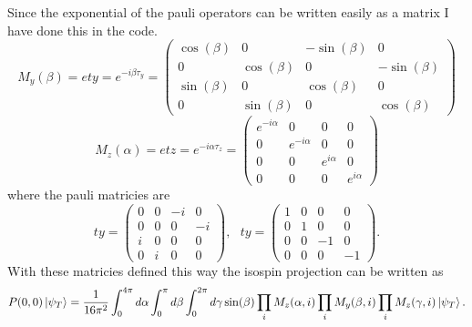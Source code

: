 Since the exponential of the pauli operators can be written easily as a matrix I have done this in the code.
\begin{equation}
   M_y(\beta)=ety=e^{-i\beta\tau_y} = \begin{pmatrix}
    \cos(\beta) & 0 & -\sin(\beta) & 0 \\
    0 & \cos(\beta) & 0 & -\sin(\beta) \\
    \sin(\beta) & 0 & \cos(\beta) & 0 \\
    0 & \sin(\beta) & 0 & \cos(\beta)
   \end{pmatrix}
\end{equation}
\begin{equation}
   M_z(\alpha)=etz=e^{-i\alpha\tau_z} = \begin{pmatrix}
   e^{-i\alpha} & 0 & 0 & 0 \\
   0 & e^{-i\alpha} & 0 & 0 \\
   0 & 0 & e^{i\alpha} & 0 \\
   0 & 0 & 0 & e^{i\alpha}
   \end{pmatrix}
\end{equation}
where the pauli matricies are
\begin{equation}
   ty= \begin{pmatrix}
   0 & 0 & -i & 0 \\
   0 & 0 & 0 & -i \\
   i & 0 & 0 & 0 \\
   0 & i & 0 & 0
   \end{pmatrix}, ~~~
   ty= \begin{pmatrix}
   1 & 0 & 0 & 0 \\
   0 & 1 & 0 & 0 \\
   0 & 0 & -1 & 0 \\
   0 & 0 & 0 & -1
   \end{pmatrix}.
\end{equation}
With these matricies defined this way the isospin projection can be written as
\begin{equation}
   P(0,0)\left| \psi_T \right> = \frac{1}{16\pi^2} \int_0^{4\pi} d\alpha \int_0^{\pi} d\beta \int_0^{2\pi} d\gamma \sin(\beta) \prod_iM_z(\alpha,i) \prod_iM_y(\beta,i) \prod_iM_z(\gamma,i) \left| \psi_T \right>.
\end{equation}


\newpage
{}
